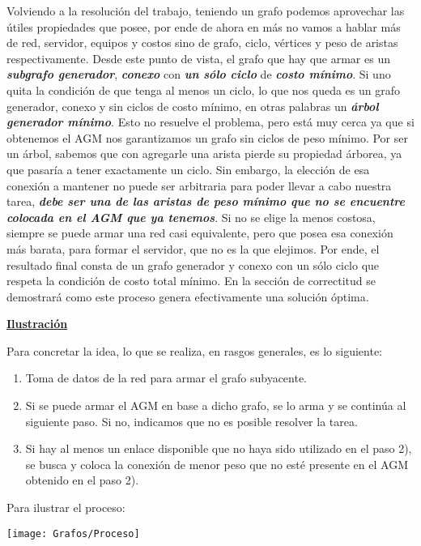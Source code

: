 Volviendo a la resolución del trabajo, teniendo un grafo podemos aprovechar las útiles propiedades que posee, por ende de ahora en más no vamos a hablar más de red, servidor, equipos y costos sino de grafo, ciclo, vértices y peso de aristas respectivamente. Desde este punto de vista, el grafo que hay que armar es un \textbf{\textit{subgrafo generador}}, \textbf{\textit{conexo}} con \textbf{\textit{un sólo ciclo}} de \textbf{\textit{costo mínimo}}. Si uno quita la condición de que tenga al menos un ciclo, lo que nos queda es un grafo generador, conexo y sin ciclos de costo mínimo, en otras palabras un \textbf{\textit{árbol generador mínimo}}. Esto no resuelve el problema, pero está muy cerca ya que si obtenemos el AGM nos garantizamos un grafo sin ciclos de peso mínimo. Por ser un árbol, sabemos que con agregarle una arista pierde su propiedad árborea, ya que pasaría a tener exactamente un ciclo. Sin embargo, la elección de esa conexión a mantener no puede ser arbitraria para poder llevar a cabo nuestra tarea,  \textbf{\textit{debe ser una de las aristas de peso mínimo que no se encuentre colocada en el AGM que ya tenemos}}. Si no se elige la menos costosa, siempre se puede armar una red casi equivalente, pero que posea esa conexión más barata, para formar el servidor, que no es la que elejimos. Por ende, el resultado final consta de un grafo generador y conexo con un sólo ciclo que respeta la condición de costo total mínimo. En la sección de correctitud se demostrará como este proceso genera efectivamente una solución óptima.

\noindent \textbf{\underline{Ilustración}}

Para concretar la idea, lo que se realiza, en rasgos generales, es lo siguiente:

\begin{enumerate}
\item Toma de datos de la red para armar el grafo subyacente.
\item Si se puede armar el AGM en base a dicho grafo, se lo arma y se continúa al siguiente paso. Si no, indicamos que no es posible resolver la tarea.
\item Si hay al menos un enlace disponible que no haya sido utilizado en el paso 2), se busca y coloca la conexión de menor peso que no esté presente en el AGM obtenido en el paso 2).
\end{enumerate}

Para ilustrar el proceso:

\texttt{[image: Grafos/Proceso]}


